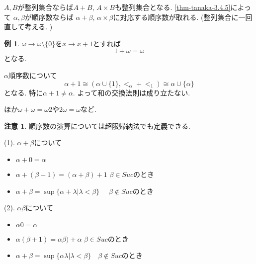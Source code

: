 \documentclass[dvipdfmx,a4paper,11pt]{report}
\theoremstyle{definition}
\newtheorem{rem}[thm]{注意}
\newtheorem{exa}[thm]{例}
\begin{document}
$A,B$が整列集合ならば$A +B$, $A \times B$も整列集合となる. 
\ref{thm-tanaka-3.4.5}によって
$\alpha, \beta$が順序数ならば
$\alpha + \beta$, $\alpha \times \beta$に対応する順序数が取れる. 
(整列集合に一回直して考える. )

\begin{exa}
$\omega \to \omega \setminus \{ 0\}$を$x \to x+1$とすれば
$$
1 + \omega =\omega
$$
となる.

$\alpha$順序数について
$$
\alpha + 1
\cong 
(\alpha \cup \{ 1\}, <_{\alpha} + <_1)
\cong
\alpha \cup\{ \alpha\}
$$
となる. 
特に$\alpha + 1 \neq \alpha$.
よって和の交換法則は成り立たない. 

ほか$\omega + \omega = \omega 2$や$2 \omega = \omega$など. 
\end{exa}


\begin{rem}
順序数の演算については超限帰納法でも定義できる. 

(1). $\alpha + \beta$について
\begin{itemize}
\item $\alpha + 0 = \alpha$
\item $\alpha + (\beta+1) = (\alpha + \beta)+1$ $\beta \in Suc$のとき
\item $\alpha + \beta = \sup\{ \alpha +\lambda | \lambda<\beta\}$
　$\beta \not \in Suc$のとき
\end{itemize}

(2). $\alpha \beta$について
\begin{itemize}
\item $\alpha  0 = \alpha$
\item $\alpha (\beta+1) = \alpha \beta)+\alpha$ $\beta \in Suc$のとき
\item $\alpha + \beta = \sup\{ \alpha \lambda | \lambda<\beta\}$　$\beta \not \in Suc$のとき
\end{itemize}
\end{rem}
\end{document}
